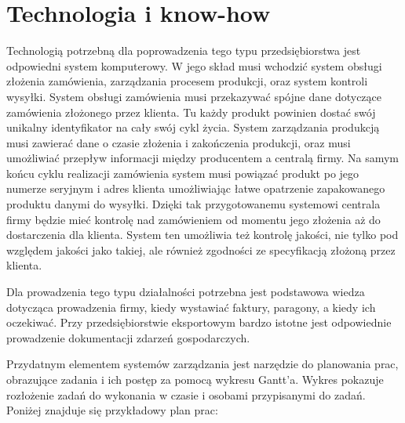 	\section{Technologia i know-how}
		\par Technologią potrzebną dla poprowadzenia tego typu przedsiębiorstwa jest odpowiedni system komputerowy. W jego skład musi wchodzić system obsługi złożenia zamówienia, zarządzania procesem produkcji, oraz system kontroli wysyłki. System obsługi zamówienia musi przekazywać spójne dane dotyczące zamówienia złożonego przez klienta. Tu każdy produkt powinien dostać swój unikalny identyfikator na cały swój cykl życia. System zarządzania produkcją musi zawierać dane o czasie złożenia i zakończenia produkcji, oraz musi umożliwiać przepływ informacji między producentem a centralą firmy. Na samym końcu cyklu realizacji zamówienia system musi powiązać produkt po jego numerze seryjnym i adres klienta umożliwiając łatwe opatrzenie zapakowanego produktu danymi do wysyłki. Dzięki tak przygotowanemu systemowi centrala firmy będzie mieć kontrolę nad zamówieniem od momentu jego złożenia aż do dostarczenia dla klienta. System ten umożliwia też kontrolę jakości, nie tylko pod względem jakości jako takiej, ale również zgodności ze specyfikacją złożoną przez klienta.
		
		\par Dla prowadzenia tego typu działalności potrzebna jest podstawowa wiedza dotycząca prowadzenia firmy, kiedy wystawiać faktury, paragony, a kiedy ich oczekiwać. Przy przedsiębiorstwie eksportowym bardzo istotne jest odpowiednie prowadzenie dokumentacji zdarzeń gospodarczych.

		\par Przydatnym elementem systemów zarządzania jest narzędzie do planowania prac, obrazujące zadania i ich postęp za pomocą wykresu Gantt'a. Wykres pokazuje rozłożenie zadań do wykonania w czasie i osobami przypisanymi do zadań. Poniżej znajduje się przykładowy plan prac:

		
		
	
